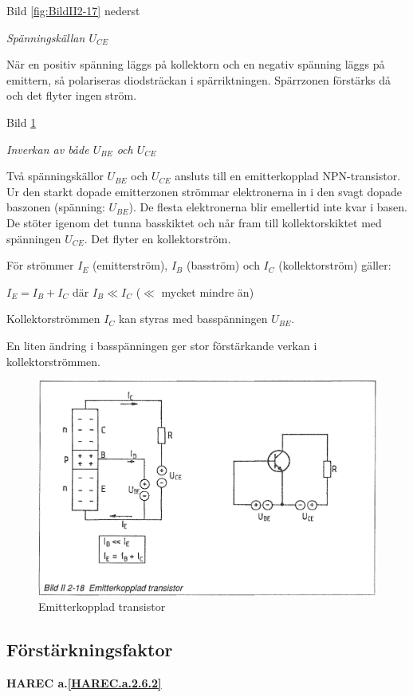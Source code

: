 Bild \ref{fig:BildII2-17} nederst

\emph{Spänningskällan \(U_{CE}\)}

När en positiv spänning läggs på kollektorn och en negativ spänning läggs på
emittern, så polariseras diodsträckan i spärriktningen. Spärrzonen förstärks då
och det flyter ingen ström.

Bild \ref{fig:BildII2-18}

\emph{Inverkan av både \(U_{BE}\) och \(U_{CE}\)}

Två spänningskällor \(U_{BE}\) och \(U_{CE}\) ansluts till en emitterkopplad NPN-transistor.
Ur den starkt dopade emitterzonen strömmar elektronerna in i den svagt dopade
baszonen (spänning: \(U_{BE}\)). De flesta elektronerna blir emellertid inte
kvar i basen. De stöter igenom det tunna basskiktet och når fram till
kollektorskiktet med spänningen \(U_{CE}\). Det flyter en kollektorström.

För strömmer \(I_E\) (emitterström), \(I_B\) (basström) och \(I_C\)
(kollektorström) gäller:

\(I_E = I_B + I_C\) där \(I_B \ll I_C\) (\(\ll\) mycket mindre än)

Kollektorströmmen \(I_C\) kan styras med basspänningen \(U_{BE}\).

En liten ändring i basspänningen ger stor förstärkande verkan i
kollektorströmmen.

\begin{figure}
\includegraphics[width=\textwidth]{images/bild_2_2-18}
\caption{Emitterkopplad transistor}
\label{fig:BildII2-18}
\end{figure}

\subsection{Förstärkningsfaktor}
\textbf{HAREC a.\ref{HAREC.a.2.6.2}\label{myHAREC.a.2.6.2}}

